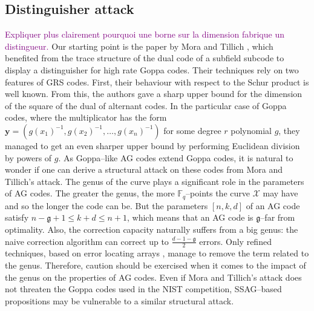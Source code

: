 \documentclass[a4paper]{amsart}
\theoremstyle{definition}
\theoremstyle{remark}
\newcommand{\calX}{\mathcal{X}}
\newcommand{\F}{\mathbb{F}}
\newcommand\jade[1]{\textcolor{purple}{#1}}
\begin{document}
\subsection*{Distinguisher attack}
\jade{Expliquer plus clairement pourquoi une borne sur la dimension fabrique un distingueur.}
Our starting point is the paper by Mora and Tillich \cite{MT21}, which benefited from the trace structure of the dual code of a subfield subcode to display a distinguisher for high rate Goppa codes. Their techniques rely on two features of GRS codes. First, their behaviour with respect to the Schur product is well known. From this, the authors gave a sharp upper bound for the dimension of the square of the dual of alternant codes. In the particular case of Goppa codes, where the multiplicator has the form $\mathbf{y}=(g(x_1)^{-1},g(x_2)^{-1},\dots,g(x_n)^{-1})$ for some degree $r$ polynomial $g$, they managed to get an even sharper upper bound by performing Euclidean division by powers of $g$.
As Goppa--like AG codes extend Goppa codes, it is natural to wonder if one can derive a structural attack on these codes from Mora and Tillich's attack. The genus of the curve plays a significant role in the parameters of AG codes. The greater the genus, the more $\F_q$--points the curve $\calX$ may have and so the longer the code can be. But the parameters $[n,k,d]$ of an AG code satisfy $n-\mathfrak{g}+1 \leq k+d \leq n+1$, which means that an AG code is $\mathfrak{g}$--far from optimality. Also, the correction capacity naturally suffers from a big genus: the naive correction algorithm can correct up to $\frac{d-1-\mathfrak{g}}{2}$ errors. Only refined techniques, based on error locating arrays \cite{CP20}, manage to remove the term related to the genus. Therefore, caution should be exercised when it comes to the impact of the genus on the properties of AG codes.
Even if Mora and Tillich's attack does not threaten the Goppa codes used in the NIST competition, SSAG--based propositions may be vulnerable to a similar structural attack. 

\medskip
\end{document}

